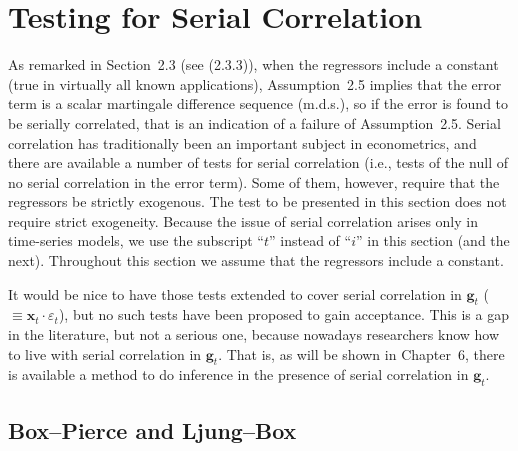 
\section{Testing for Serial Correlation}
\label{sec:2.10}

As remarked in Section~2.3 (see (2.3.3)), when the regressors include a constant
(true in virtually all known applications), Assumption~2.5 implies that the error
term is a scalar martingale difference sequence (m.d.s.), so if the error is found to
be serially correlated, that is an indication of a failure of Assumption~2.5. Serial
correlation has traditionally been an important subject in econometrics, and there
are available a number of tests for serial correlation (i.e., tests of the null of no
serial correlation in the error term). Some of them, however, require that the
regressors be strictly exogenous. The test to be presented in this section does not
require strict exogeneity. Because the issue of serial correlation arises only in time-series models, we use the subscript ``$t$'' instead of ``$i$'' in this section (and the next).
Throughout this section we assume that the regressors include a constant.

It would be nice to have those tests extended to cover serial correlation in $\mathbf{g}_t$
($\equiv \mathbf{x}_t \cdot \varepsilon_t$), but no such tests have been proposed to gain acceptance. This is a gap
in the literature, but not a serious one, because nowadays researchers know how
to live with serial correlation in $\mathbf{g}_t$. That is, as will be shown in Chapter~6, there
is available a method to do inference in the presence of serial correlation in $\mathbf{g}_t$.

\subsection*{Box--Pierce and Ljung--Box}

